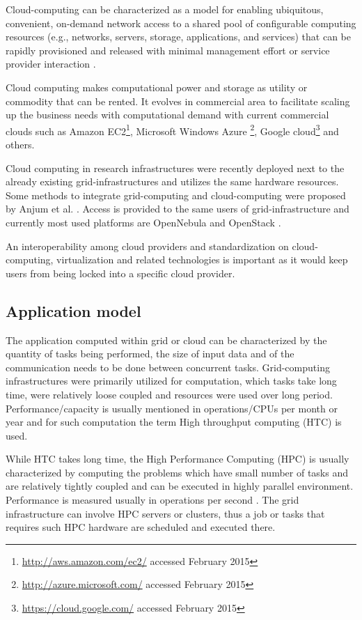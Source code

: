Cloud-computing can be characterized as a model for enabling ubiquitous, convenient, on-demand network access to a shared pool of configurable computing resources (e.g., networks, servers, storage, applications, and services) that can be rapidly provisioned and released with minimal management effort or service provider interaction \cite{Mell2011}.  

Cloud computing makes computational power and storage as utility or commodity that can be rented. It evolves in commercial area to facilitate scaling up the business needs with computational demand with current commercial clouds such as Amazon EC2\footnote{\url{http://aws.amazon.com/ec2/} accessed February 2015}, Microsoft Windows Azure \footnote{\url{http://azure.microsoft.com/} accessed February 2015}, Google cloud\footnote{\url{https://cloud.google.com/} accessed February 2015} and others.

Cloud computing in research infrastructures were recently deployed next to the already existing grid-infrastructures and utilizes the same hardware resources. Some methods to integrate grid-computing and cloud-computing were proposed by Anjum et al. \cite{Anjum2012}. Access is provided to the same users of grid-infrastructure and currently most used platforms are Open\-Nebula  \cite{Milojicic2011} and OpenStack \cite{Kumar2014}.

An interoperability among cloud providers and standardization on cloud-computing, virtualization and related technologies is important as it would keep users from being locked into a specific cloud provider\cite{Ortiz2011}.

\subsection{Application model}

The application computed within grid or cloud can be characterized by the quantity of tasks being performed, the size of input data and of the communication needs to be done between concurrent tasks. 
Grid-computing infrastructures were primarily utilized for computation, which tasks take long time, were relatively loose coupled and resources were used over long period. Performance/capacity is usually mentioned  in operations/CPUs per month or year and for such computation the term High throughput computing (HTC) is used.

While HTC takes long time, the High Performance Computing (HPC) is usually characterized by computing the problems which have small number of tasks and are relatively tightly coupled and can be executed in highly parallel environment. Performance is measured usually in operations per second  \cite{Hager2010,Levesque2010}. The grid infrastructure can involve HPC servers or clusters, thus a job or tasks that requires such HPC hardware are scheduled and executed there.

